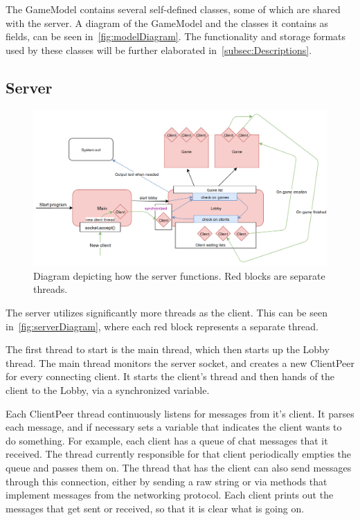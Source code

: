\documentclass[12pt, letterpaper]{article}
\begin{document}
    The GameModel contains several self-defined classes, some of which are shared with the server.
    A diagram of the GameModel and the classes it contains as fields, can be seen in~\autoref{fig:modelDiagram}.
    The functionality and storage formats used by these classes
    will be further elaborated in~\autoref{subsec:Descriptions}.


    \subsection{Server}
    \label{subsec:serverDesign}

    \begin{figure}[ht]
        \begin{center}
            \includegraphics[width=\textwidth]{Server.png}
            \caption{Diagram depicting how the server functions.
            Red blocks are separate threads.}
            \label{fig:serverDiagram}
        \end{center}
    \end{figure}

    The server utilizes significantly more threads as the client.
    This can be seen in~\autoref{fig:serverDiagram}, where each red block represents a separate thread.

    The first thread to start is the main thread, which then starts up the Lobby thread.
    The main thread monitors the server socket, and creates a new ClientPeer for every connecting client.
    It starts the client's thread and then hands of the client to the Lobby, via a synchronized variable.

    Each ClientPeer thread continuously listens for messages from it's client.
    It parses each message, and if necessary sets a variable that indicates the client wants to do something.
    For example, each client has a queue of chat messages that it received.
    The thread currently responsible for that client periodically empties the queue and passes them on.
    The thread that has the client can also send messages through this connection, either by sending a raw string
    or via methods that implement messages from the networking protocol.
    Each client prints out the messages that get sent or received, so that it is clear what is going on.
\end{document}
